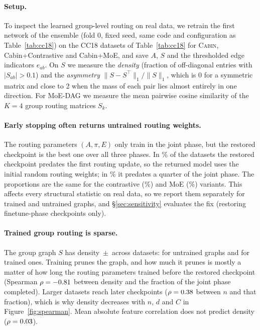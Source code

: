 \documentclass[anon,12pt]{clear2027} %
\newcommand{\Cabin}{\textsc{Cabin}}
\newcommand{\T}{^{\top}}
\begin{document}
\paragraph{Setup.}
To inspect the learned group-level routing on real data, we retrain the first network of the ensemble (fold 0, fixed seed, same code and configuration as Table~\ref{tab:cc18}) on the \DagN{} CC18 datasets of Table~\ref{tab:cc18} for \Cabin{}, Cabin+Contrastive and Cabin+MoE, and save $A$, $S$ and the thresholded edge indicators $e_{ab}$. On $S$ we measure the \emph{density} (fraction of off-diagonal entries with $|S_{ab}|>0.1$) and the \emph{asymmetry} $\|S-S\T\|_1/\|S\|_1$, which is 0 for a symmetric matrix and close to 2 when the mass of each pair lies almost entirely in one direction. For MoE-DAG we measure the mean pairwise cosine similarity of the $K=4$ group routing matrices $S_k$.

\paragraph{Early stopping often returns untrained routing weights.}
The routing parameters $(A,\pi,E)$ only train in the joint phase, but the restored checkpoint is the best one over all three phases. In \DagBaseUntrained{}\% of the datasets the restored checkpoint predates the first routing update, so the returned model uses the initial random routing weights; in \DagBaseEarly{}\% it predates a quarter of the joint phase. The proportions are the same for the contrastive (\DagConUntrained{}\%) and MoE (\DagMoEUntrained{}\%) variants. This affects every structural statistic on real data, so we report them separately for trained and untrained graphs, and \S\ref{sec:sensitivity} evaluates the fix (restoring finetune-phase checkpoints only).

\paragraph{Trained group routing is sparse.}
The group graph $S$ has density \DagBaseDensity{}\,$\pm$\,\DagBaseDensitySd{} across datasets: \DagDensUntrained{} for untrained graphs and \DagDensTrained{} for trained ones. Training prunes the graph, and how much it prunes is mostly a matter of how long the routing parameters trained before the restored checkpoint (Spearman $\rho=-0.81{}$ between density and the fraction of the joint phase completed). Larger datasets reach later checkpoints ($\rho=0.38{}$ between $n$ and that fraction), which is why density decreases with $n$, $d$ and $C$ in Figure~\ref{fig:spearman}. Mean absolute feature correlation does not predict density ($\rho=0.03{}$).
\end{document}
